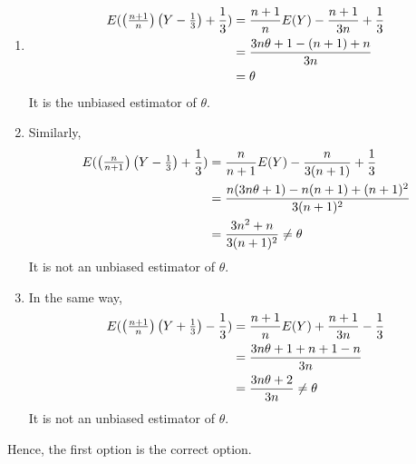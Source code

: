 \documentclass{article}[]
\begin{document}
\begin{enumerate}
\item
{
\begin{align}
E(\begin{pmatrix}\frac{n+1}{n}\end{pmatrix}\begin{pmatrix}Y-\frac{1}{3}\end{pmatrix} + \frac{1}{3}) &= \frac{n+1}{n}E(Y)-\frac{n+1}{3n} + \frac{1}{3}\\
&=\frac{3n\theta+1-(n+1)+n}{3n}\\
&=\theta
\end{align}
It is the unbiased estimator of $\theta$.
}
\item
{
Similarly,
\begin{align}
E(\begin{pmatrix}\frac{n}{n+1}\end{pmatrix}\begin{pmatrix}Y-\frac{1}{3}\end{pmatrix} + \frac{1}{3})&=\frac{n}{n+1}E(Y) - \frac{n}{3(n+1)} + \frac{1}{3}\\
&=\frac{n(3n\theta+1) - n(n+1) + (n+1)^2}{3(n+1)^2}\\
&=\frac{3n^2+n}{3(n+1)^2} \neq \theta
\end{align}
It is not an unbiased estimator of $\theta$.
}
\item
{
In the same way,
\begin{align}
E(\begin{pmatrix}\frac{n+1}{n}\end{pmatrix}\begin{pmatrix}Y+\frac{1}{3}\end{pmatrix} - \frac{1}{3})&=\frac{n+1}{n}E(Y) + \frac{n+1}{3n} - \frac{1}{3}\\
&=\frac{3n\theta+1+n+1-n}{3n}\\
&=\frac{3n\theta+2}{3n} \neq \theta
\end{align}
It is not an unbiased estimator of $\theta$.
}
\end{enumerate}
Hence, the first option is the correct option.
\end{document}
